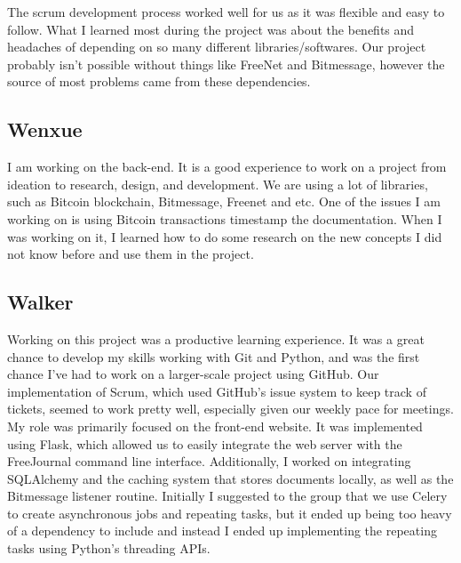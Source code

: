 \documentclass[letterpaper,10pt,oneside]{sphinxmanual}
\begin{document}
The scrum development process worked well for us as it was flexible and easy to follow. What I learned most
during the project was about the benefits and headaches of depending on so many different libraries/softwares.
Our project probably isn't possible without things like FreeNet and Bitmessage, however the source of most
problems came from these dependencies.


\subsection{Wenxue}
\label{future:wenxue}
I am working on the back-end. It is a good experience to work on a project from ideation to research, design,
and development. We are using a lot of libraries, such as Bitcoin blockchain, Bitmessage, Freenet and etc. One
of the issues I am working on is using Bitcoin transactions timestamp the documentation. When I was working on
it, I learned how to do some research on the new concepts I did not know before and use them in the project.


\subsection{Walker}
\label{future:walker}
Working on this project was a productive learning experience. It was a great chance to develop my skills
working with Git and Python, and was the first chance I've had to work on a larger-scale project using GitHub.
Our implementation of Scrum, which used GitHub's issue system to keep track of tickets, seemed to work pretty
well, especially given our weekly pace for meetings. My role was primarily focused on the front-end website.
It was implemented using Flask, which allowed us to easily integrate the web server with the FreeJournal
command line interface. Additionally, I worked on integrating SQLAlchemy and the caching system that stores
documents locally, as well as the Bitmessage listener routine. Initially I suggested to the group that we use
Celery to create asynchronous jobs and repeating tasks, but it ended up being too heavy of a dependency to
include and instead I ended up implementing the repeating tasks using Python’s threading APIs.
\end{document}
